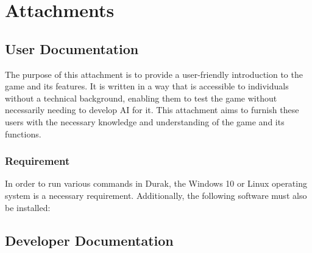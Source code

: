 \documentclass[12pt,a4paper]{report}
\let\openright=\clearpage
\begin{document}



\tableofcontents













\listoffigures

\listoftables


\appendix
\chapter{Attachments}

\section{User Documentation}
\label{userdoc}

The purpose of this attachment is to provide a user-friendly introduction to the game and its features. It is written in a way that is accessible to individuals without a technical background, enabling them to test the game without necessarily needing to develop AI for it. This attachment aims to furnish these users with the necessary knowledge and understanding of the game and its functions.

\subsection{Requirement}

In order to run various commands in Durak, the Windows 10 or Linux operating system is a necessary requirement. Additionally, the following software must also be installed: 

\section{Developer Documentation}
\label{devdoc}

\openright
\end{document}
